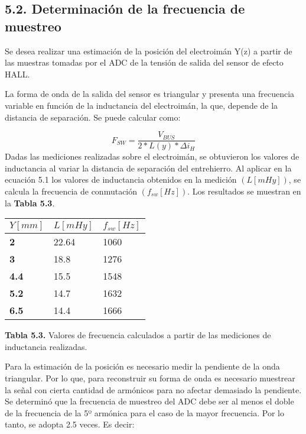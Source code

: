 \documentclass{article} %
\begin{document}
\noindent 
\subsection{5.2. Determinaci\'{o}n de la frecuencia de muestreo}

\noindent Se desea realizar una estimaci\'{o}n de la posici\'{o}n del electroim\'{a}n Y(z)  a partir de las muestras tomadas por el ADC de la tensi\'{o}n de salida del sensor de efecto HALL.

\noindent 

\noindent La forma de onda de la salida del sensor es triangular y presenta una frecuencia variable en funci\'{o}n de la inductancia del electroim\'{a}n, la que, depende de la distancia de separaci\'{o}n. Se puede calcular como:

\noindent 
\begin{equation} \label{GrindEQ__5_1_} 
F_{SW}=\frac{V_{BUS}}{2*L(y)*\mathit{\Delta}i_H} 
\end{equation} 
Dadas las mediciones realizadas sobre el electroim\'{a}n, se obtuvieron los valores de inductancia al variar la distancia de separaci\'{o}n del entrehierro. Al aplicar en la ecuaci\'{o}n\textbf{ }5.1 los valores de inductancia obtenidos en la medici\'{o}n $(L[mHy])$, se calcula la frecuencia de conmutaci\'{o}n  $(f_{sw}[Hz])$. Los resultados se muestran en la \textbf{Tabla 5.3}.

\begin{tabular}{|p{1.4in}|p{1.4in}|p{1.4in}|} \hline 
$Y[mm]$ & $L[mHy]$ & $f_{sw}[Hz]$ \\ \hline 
\textbf{2} & 22.64 & 1060 \\ \hline 
\textbf{3} & 18.8 & 1276 \\ \hline 
\textbf{4.4} & 15.5 & 1548 \\ \hline 
\textbf{5.2} & 14.7 & 1632 \\ \hline 
\textbf{6.5} & 14.4 & 1666 \\ \hline 
\end{tabular}



\noindent \textbf{Tabla 5.3. }Valores de frecuencia calculados a partir de las mediciones de inductancia realizadas.

\noindent 

\noindent Para la estimaci\'{o}n de la posici\'{o}n es necesario medir la pendiente de la onda triangular. Por lo que, para reconstruir su forma de onda es necesario muestrear la se\~{n}al con cierta cantidad de arm\'{o}nicos para no afectar demasiado la pendiente. Se determin\'{o} que la frecuencia de muestreo del ADC debe ser al menos el doble de la frecuencia de la 5º arm\'{o}nica para el caso de la mayor frecuencia. Por lo tanto, se adopta 2.5 veces. Es decir:
\end{document}
